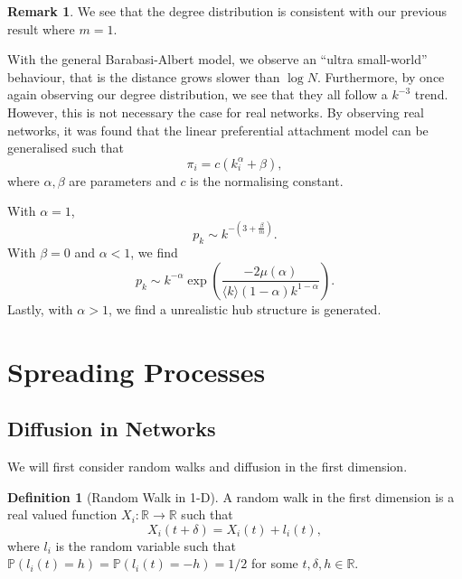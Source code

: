 \documentclass[
]{article}
\theoremstyle{definition}
\newtheorem*{remark}{Remark}
\theoremstyle{definition}
\newtheorem{definition}{Definition}[section]
\begin{document}
\begin{remark}
  We see that the degree distribution is consistent with our previous result 
  where \(m = 1\).
\end{remark}

With the general Barabasi-Albert model, we observe an ``ultra
small-world'' behaviour, that is the distance grows slower than
\(\log N\). Furthermore, by once again observing our degree
distribution, we see that they all follow a \(k^{-3}\) trend. However,
this is not necessary the case for real networks. By observing real
networks, it was found that the linear preferential attachment model can
be generalised such that \[\pi_i = c(k_i^\alpha + \beta),\] where
\(\alpha, \beta\) are parameters and \(c\) is the normalising constant.

With \(\alpha = 1\),
\[p_k \sim k^{- \left(3 + \frac{\beta}{m}\right)}.\] With \(\beta = 0\)
and \(\alpha < 1\), we find
\[p_k \sim k^{-\alpha}\exp\left(\frac{-2 \mu(\alpha)}
{\langle k\rangle (1 - \alpha)k^{1 - \alpha}}\right).\] Lastly, with
\(\alpha > 1\), we find a unrealistic hub structure is generated.

\newpage

\hypertarget{spreading-processes}{%
\section{Spreading Processes}\label{spreading-processes}}

\hypertarget{diffusion-in-networks}{%
\subsection{Diffusion in Networks}\label{diffusion-in-networks}}

We will first consider random walks and diffusion in the first
dimension.

\begin{definition}[Random Walk in 1-D]
  A random walk in the first dimension is a real valued function 
  \(X_i : \mathbb{R} \to \mathbb{R}\) such that 
  \[X_i(t + \delta) = X_i(t) + l_i(t),\]
  where \(l_i\) is the random variable such that 
  \(\mathbb{P}(l_i(t) = h) = \mathbb{P}(l_i(t) = -h) = 1 / 2\) for 
  some \(t, \delta, h \in \mathbb{R}\).
\end{definition}
\end{document}
